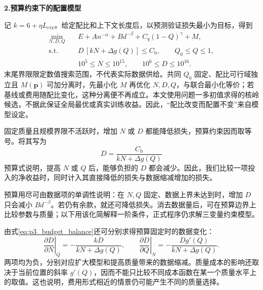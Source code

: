\textbf{2.预算约束下的配置模型}\par\nopagebreak[4]
记 $k=6+\eta L_{\mathrm{ctx}}$。给定配比和上下文长度后，以预测验证损失最小为目标，得到
\begin{equation}
 \begin{aligned}
 \min_{N,D,Q}\quad &E+A n^{-\alpha}+B d^{-\beta}+C_q(1-Q)^\gamma+M,\\
 \mathrm{s.t.}\quad&D\,[kN+\Delta g(Q)]\le C_{\mathrm b},\qquad Q_0\le Q\le1,\\
 &10^5\le N\le10^{15},\qquad 10^6\le D\le10^{16}.
 \end{aligned}
 \label{eq:p3_problem}
\end{equation}
末尾界限限定数值搜索范围，不代表实际数据供给。共同 $Q_0$ 固定、配比可行域独立且 $M(\bm p)$ 可加分离时，先最小化 $M$ 再优化 $N,D,Q$，与联合最小化等价；若基线或费用随配比变化，这种分离便不再成立。本文使用问题一多初值求得的核岭候选，不据此保证全局最优或真实训练收益。因此，“配比改变而配置不变”来自模型设定。

固定质量且规模界限不活跃时，增加 $N$ 或 $D$ 都能降低损失，预算约束因而取等号。将其写为
\begin{equation}
 D=\frac{C_{\mathrm b}}{kN+\Delta g(Q)}
 \label{eq:p3_budget_balance}
\end{equation}
预算式说明，提高 $N$ 或 $Q$ 后，能够负担的 $D$ 都会减少。因此，我们比较一项投入的净收益时，同时计入其直接降低的损失与数据缩减增加的损失。

预算用尽可由数据项的单调性说明：在 $N,Q$ 固定、数据上界未达到时，增加 $D$ 只会减小 $Bd^{-\beta}$。若仍有余款，就还可降低损失。消去数据量后，可在预算边界上比较参数与质量；以下用该化简解释一阶条件，正式程序仍求解三变量约束模型。

由式\eqref{eq:p3_budget_balance}还可分别求得预算固定时的数据变化：
\begin{equation}
 \left.\frac{\partial D}{\partial N}\right|_Q
 =-\frac{kD}{kN+\Delta g(Q)},\qquad
 \left.\frac{\partial D}{\partial Q}\right|_N
 =-\frac{Dg'(Q)}{kN+\Delta g(Q)}.
 \label{q3_expand_data_tradeoff}
\end{equation}
两项均为负，分别对应扩大模型和提高质量带来的数据缩减。质量成本的影响还取决于当前位置的斜率 $g'(Q)$，因而不能只比较不同成本函数在某一个质量水平上的取值。这也说明，费用形式相近的情景仍可能产生不同的质量选择。

